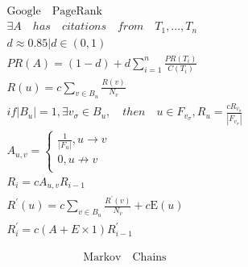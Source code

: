 \documentclass{article}
\begin{document}
\begin{align*}
    \mathrm{Google \quad PageRank}\\
    \exists A \quad has \quad citations \quad from \quad T_{1},...,T_{n}\\
    d \approx 0.85 | d \in (0,1) \\
    PR(A) = (1-d) + d\sum_{i=1}^{n}\frac{PR(T_{i})}{C(T_{i})} \\
    R(u) = c \sum_{v \in B_{u}} \frac{R(v)}{N_{v}}\\
    if |B_{u}| = 1, \exists v_{\sigma} \in B_{u},\quad then \quad u \in F_{v_{\sigma}},R_{u} = \frac{cR_{v_{\sigma}}}{|F_{v_{\sigma}}|}\\
    A_{u,v} = \left\{ 
    \begin{array}{rl} 
        \frac{1}{|F_{u}|},u \rightarrow v  \\ 
        0, u \nrightarrow v \\
    \end{array} \right. \ \\ 
    R_{i} = cA_{u,v}R_{i-1}\\
    R^{'}(u) = c\sum_{v \in B_{u}}\frac{R^{'}(v)}{N_{v}} + c\mathrm{E}(u)\\
    R^{'}_{i} = c(A + E \times \mathrm{1})R^{'}_{i-1}
\end{align*}

\begin{align*}
    \mathrm{Markov \quad Chains}\\
\end{align*}
\end{document}
